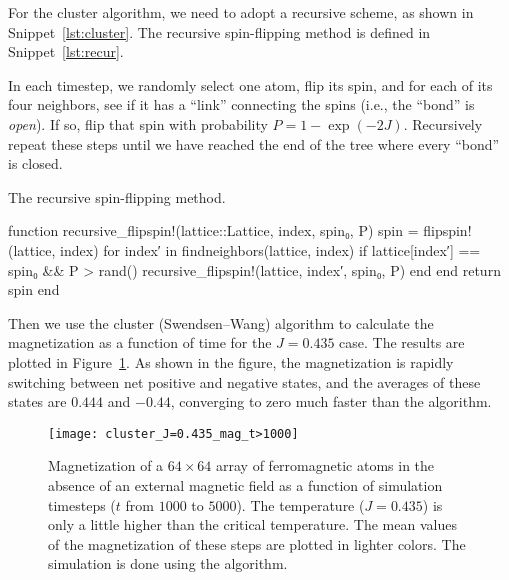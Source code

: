 For the cluster algorithm, we need to adopt a recursive scheme, as shown in
Snippet~\ref{lst:cluster}. The recursive spin-flipping method is defined in
Snippet~\ref{lst:recur}.

In each timestep, we randomly select one atom, flip its spin, and for each of its four
neighbors, see if it has a ``link'' connecting the spins (i.e., the ``bond'' is \emph{open}).
If so, flip that spin with probability \(P = 1 - \exp(-2J)\).
Recursively repeat these steps until we have reached the end of the tree where
every ``bond'' is closed.

\begin{algorithm}[H]
    \caption{The recursive spin-flipping method.}
    \label{lst:recur}
    \begin{juliacode}
        function recursive_flipspin!(lattice::Lattice, index, spin₀, P)
            spin = flipspin!(lattice, index)
            for index′ in findneighbors(lattice, index)
                if lattice[index′] == spin₀ && P > rand()
                    recursive_flipspin!(lattice, index′, spin₀, P)
                end
            end
            return spin
        end
    \end{juliacode}
\end{algorithm}

Then we use the cluster (Swendsen--Wang) algorithm to calculate the magnetization as a
function of time for the \(J = 0.435\) case. The results are plotted in
Figure~\ref{fig:mag_J=0.435_cluster}. As shown in the figure, the magnetization is rapidly
switching between net positive and negative states, and the averages of these states are
\(0.444\) and \(-0.44\), converging to zero much faster than the  algorithm.

\begin{figure}[hbt]
    \centering
    \texttt{[image: cluster\_J=0.435\_mag\_t>1000]}
    \caption{Magnetization of a \(64 \times 64\) array of ferromagnetic atoms in the absence
        of an external magnetic field as a function of simulation timesteps (\(t\) from
        \(1000\) to \(5000\)). The temperature (\(J = 0.435\)) is only a little higher than
        the critical temperature. The mean values of the magnetization of these steps are
        plotted in lighter colors. The simulation is done using the 
        algorithm.}
    \label{fig:mag_J=0.435_cluster}
\end{figure}
